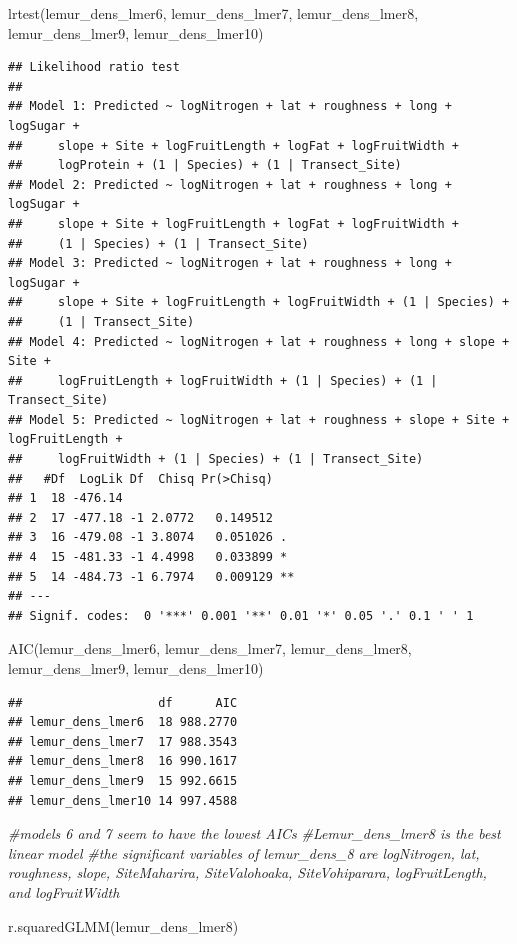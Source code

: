 \documentclass[
  12pt,
]{article}
\newenvironment{Shaded}{\begin{snugshade}}{\end{snugshade}}
\newcommand{\CommentTok}[1]{\textcolor[rgb]{0.56,0.35,0.01}{\textit{#1}}}
\newcommand{\FunctionTok}[1]{\textcolor[rgb]{0.00,0.00,0.00}{#1}}
\newcommand{\NormalTok}[1]{#1}
\begin{document}
\begin{Shaded}
\begin{Highlighting}[]
\FunctionTok{lrtest}\NormalTok{(lemur\_dens\_lmer6, lemur\_dens\_lmer7, lemur\_dens\_lmer8, lemur\_dens\_lmer9, lemur\_dens\_lmer10)}
\end{Highlighting}
\end{Shaded}

\begin{verbatim}
## Likelihood ratio test
## 
## Model 1: Predicted ~ logNitrogen + lat + roughness + long + logSugar + 
##     slope + Site + logFruitLength + logFat + logFruitWidth + 
##     logProtein + (1 | Species) + (1 | Transect_Site)
## Model 2: Predicted ~ logNitrogen + lat + roughness + long + logSugar + 
##     slope + Site + logFruitLength + logFat + logFruitWidth + 
##     (1 | Species) + (1 | Transect_Site)
## Model 3: Predicted ~ logNitrogen + lat + roughness + long + logSugar + 
##     slope + Site + logFruitLength + logFruitWidth + (1 | Species) + 
##     (1 | Transect_Site)
## Model 4: Predicted ~ logNitrogen + lat + roughness + long + slope + Site + 
##     logFruitLength + logFruitWidth + (1 | Species) + (1 | Transect_Site)
## Model 5: Predicted ~ logNitrogen + lat + roughness + slope + Site + logFruitLength + 
##     logFruitWidth + (1 | Species) + (1 | Transect_Site)
##   #Df  LogLik Df  Chisq Pr(>Chisq)   
## 1  18 -476.14                        
## 2  17 -477.18 -1 2.0772   0.149512   
## 3  16 -479.08 -1 3.8074   0.051026 . 
## 4  15 -481.33 -1 4.4998   0.033899 * 
## 5  14 -484.73 -1 6.7974   0.009129 **
## ---
## Signif. codes:  0 '***' 0.001 '**' 0.01 '*' 0.05 '.' 0.1 ' ' 1
\end{verbatim}

\begin{Shaded}
\begin{Highlighting}[]
\FunctionTok{AIC}\NormalTok{(lemur\_dens\_lmer6, lemur\_dens\_lmer7, lemur\_dens\_lmer8, lemur\_dens\_lmer9, lemur\_dens\_lmer10)}
\end{Highlighting}
\end{Shaded}

\begin{verbatim}
##                   df      AIC
## lemur_dens_lmer6  18 988.2770
## lemur_dens_lmer7  17 988.3543
## lemur_dens_lmer8  16 990.1617
## lemur_dens_lmer9  15 992.6615
## lemur_dens_lmer10 14 997.4588
\end{verbatim}

\begin{Shaded}
\begin{Highlighting}[]
\CommentTok{\#models 6 and 7 seem to have the lowest AICs}
\CommentTok{\#Lemur\_dens\_lmer8 is the best linear model}
\CommentTok{\#the significant variables of lemur\_dens\_8 are logNitrogen, lat, roughness, slope, SiteMaharira, SiteValohoaka, SiteVohiparara, logFruitLength, and logFruitWidth}

\FunctionTok{r.squaredGLMM}\NormalTok{(lemur\_dens\_lmer8)}
\end{Highlighting}
\end{Shaded}
\end{document}
